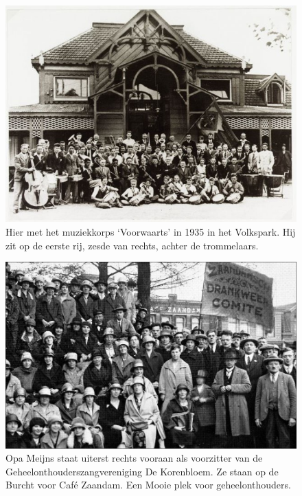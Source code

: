 \documentclass[10pt,twoside, openright]{memoir}
\begin{document}
\begin{figure}
\includegraphics[width=\textwidth]{img/ch2/ch2-afb05}
\caption*{\footnotesize Hier met het muziekkorps `Voorwaarts' in 1935 in het Volkspark. Hij zit op de eerste rij, zesde van rechts, achter de trommelaars.}
\end{figure}

\begin{figure}
\includegraphics[width=\textwidth]{img/14OpaMeijns7}
\caption*{\footnotesize Opa Meijns staat uiterst rechts vooraan als voorzitter van de Geheelonthouderszangvereniging De Korenbloem. Ze staan op de Burcht voor Café Zaandam. Een Mooie plek voor geheelonthouders.}
\end{figure}
\end{document}
